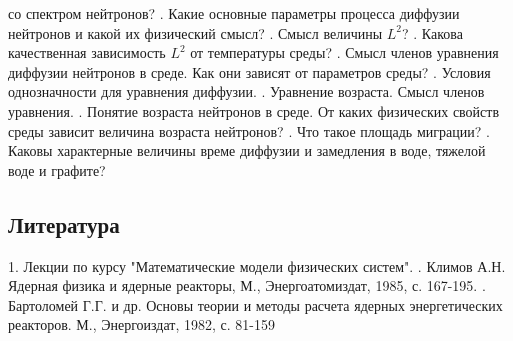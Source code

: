\documentclass[a4paper]{article}
\begin{document}
    со спектром нейтронов?
    . Какие основные параметры процесса диффузии нейтронов и какой
    их физический смысл?
    . Смысл величины $L^2$?
    . Какова качественная зависимость $L^2$ от температуры среды?
    . Смысл членов уравнения диффузии нейтронов в среде. Как они
    зависят от параметров среды?
    . Условия однозначности для уравнения диффузии.
    . Уравнение возраста. Смысл членов уравнения.
    . Понятие возраста нейтронов в среде. От каких физических
    свойств среды зависит величина возраста нейтронов?
    . Что такое площадь миграции?
    . Каковы характерные величины време диффузии и замедления в
    воде, тяжелой воде и графите?
    \subsection{Литература}
    1. Лекции по курсу "Математические модели физических систем".
    . Климов А.Н. Ядерная физика и ядерные реакторы, М.,
    Энергоатомиздат, 1985, с. 167-195.
    . Бартоломей Г.Г. и др. Основы теории и методы расчета ядерных
    энергетических реакторов. М., Энергоиздат, 1982, с. 81-159
\end{document}
